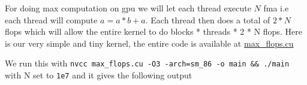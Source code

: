 For doing max computation on gpu we will let each thread execute \(N\)
fma i.e each thread will compute \(a = a *b + a\). Each thread then does
a total of \(2 * N\) flops which will allow the entire kernel to do
blocks * threads * 2 * N flops. Here is our very simple and tiny kernel,
the entire code is available at \url{max_flops.cu}

\begin{Shaded}
\begin{Highlighting}[]
 
\OperatorTok{(}
     \OperatorTok{*}\OperatorTok{,}
    \OperatorTok{,} 
\OperatorTok{)} \OperatorTok{\{}

    \OperatorTok{=}\OperatorTok{;}
    \OperatorTok{=}\OperatorTok{+}\OperatorTok{;}
    \OperatorTok{=}\OperatorTok{{-}}\OperatorTok{;}

     \OperatorTok{(}\OperatorTok{=} \OperatorTok{;}\OperatorTok{\textless{}}\OperatorTok{;}\OperatorTok{++)} \OperatorTok{\{}
\OperatorTok{=}\OperatorTok{*}\OperatorTok{+}\OperatorTok{;}
    \OperatorTok{\}}

\OperatorTok{[}\OperatorTok{*}\OperatorTok{+}\OperatorTok{]} \OperatorTok{=}\OperatorTok{;}
\OperatorTok{\}}

\OperatorTok{\textless{}\textless{}\textless{}}\OperatorTok{,} \OperatorTok{\textgreater{}\textgreater{}\textgreater{}(}
\OperatorTok{,}\OperatorTok{,}
\OperatorTok{);}
\end{Highlighting}
\end{Shaded}

We run this with
\texttt{nvcc\ max\_flops.cu\ -O3\ -arch=sm\_86\ -o\ main\ \&\&\ ./main}
with N set to \texttt{1e7} and it gives the following output

\begin{Shaded}
\begin{Highlighting}[]
\ErrorTok{(}\KeywordTok{)}
\end{Highlighting}
\end{Shaded}

